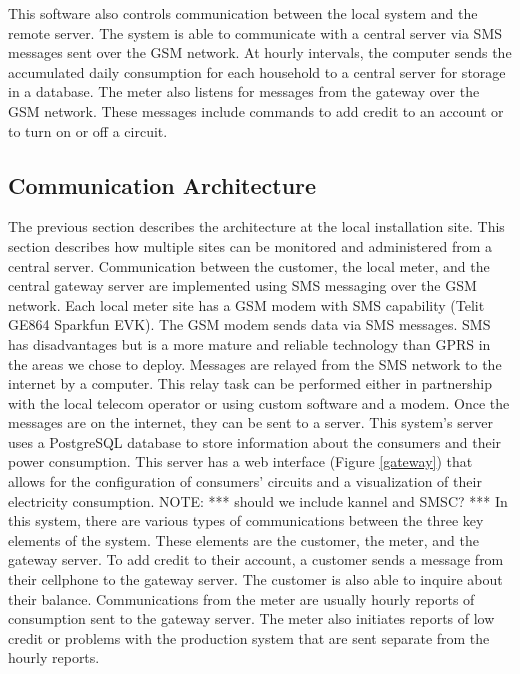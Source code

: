 \documentclass[conference]{IEEEtran}
\newcommand{\note}[1]{{\color{red} NOTE: *** #1 ***}}
\begin{document}
This software also controls communication between the 
local system and the remote server.  
The system is able to communicate with a central server via SMS messages
sent over the GSM network.
At hourly intervals, the computer
sends the accumulated daily consumption for each household to a central 
server for storage in a database.
The meter also listens for messages from the gateway over the GSM network.
These messages
include commands to add credit to an account or to turn on or off a 
circuit.

\subsection{Communication Architecture}
The previous section describes the architecture at the local
installation site.  This section describes how multiple sites can be
monitored and administered from a central server.  Communication
between the customer, the local meter, and the central gateway
server are implemented using SMS messaging over the GSM network.
Each local meter site has a GSM modem with SMS capability 
(Telit GE864 Sparkfun EVK).
The GSM modem sends data via SMS messages.  SMS has disadvantages but
is a more mature and reliable technology than GPRS in the areas we
chose to deploy.
Messages are 
relayed from the SMS network to the internet by a computer.  
This relay task can be performed either in partnership with the local
telecom operator or using custom software and a modem.
Once the 
messages are on the internet, they can be sent to a server.  This 
system's server uses a PostgreSQL database to store information
about the consumers and their power consumption.  This server has
a web interface (Figure \ref{gateway}) that allows for the configuration 
of consumers' circuits and a visualization of their electricity consumption.
\note{should we include kannel and SMSC?}
In this system, there are various types of communications between the 
three key elements of the system.  These elements are the customer, the 
meter, and the gateway server.
To add credit to their account, a customer sends a message from their 
cellphone to the gateway server.  The customer is also able to inquire 
about their balance.
Communications from the meter are usually hourly reports of consumption
sent to the gateway server.  The meter also initiates reports of low
credit or problems with the production system that are sent separate from
the hourly reports.
\end{document}
